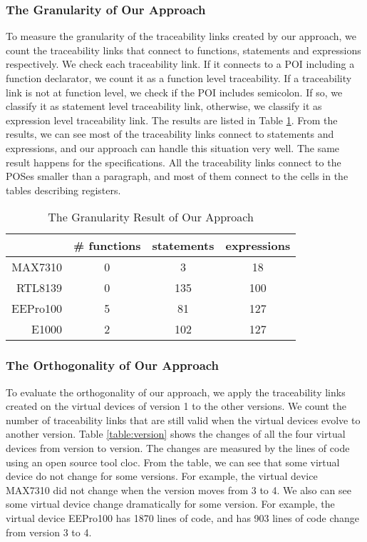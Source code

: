\subsubsection{The Granularity of Our Approach}
To measure the granularity of the traceability links created by our approach, we count the traceability links that connect to functions, statements and expressions respectively. We check each traceability link. If it connects to a POI including a function declarator, we count it as a function level traceability. If a traceability link is not at function level, we check if the POI includes semicolon. If so, we classify it as statement level traceability link, otherwise, we classify it as expression level traceability link. The results are listed in Table \ref{table:granularity}. From the results, we can see most of the traceability links connect to statements and expressions, and our approach can handle this situation very well. The same result happens for the specifications. All the traceability links connect to the POSes smaller than a paragraph, and most of them connect to the cells in the tables describing registers.

\begin{table}[th]
\caption{The Granularity Result of Our Approach}
\centering
\begin{tabular*}{0.6\textwidth}{@{\extracolsep{\fill}}rccc}
\hline
 & \# functions & statements & expressions \\
\hline
MAX7310 & 0 & 3 & 18\\
RTL8139  & 0 & 135 & 100\\
EEPro100  & 5 & 81 & 127\\
E1000  & 2 & 102 & 127\\
\hline
\end{tabular*}
\label{table:granularity}
\end{table}


\subsubsection{The Orthogonality of Our Approach}

To evaluate the orthogonality of our approach, we apply the traceability links created on the virtual devices of version 1 to the other versions. We count the number of traceability links that are still valid when the virtual devices evolve to another version.
Table \ref{table:version} shows the changes of all the four virtual devices from version to version. The changes are measured by the lines of code using an open source tool cloc. From the table, we can see that some virtual device do not change for some versions. For example, the virtual device MAX7310 did not change when the version moves from 3 to 4. We also can see some virtual device change dramatically for some version. For example, the virtual device EEPro100 has 1870 lines of code, and has 903 lines of code change from version 3 to 4.

